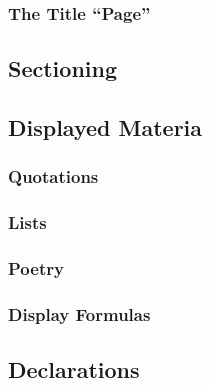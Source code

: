 \subsubsection{The Title ``Page''}


\subsection{Sectioning}


\subsection{Displayed Materia}
\subsubsection{Quotations}
\subsubsection{Lists}
\subsubsection{Poetry}
\subsubsection{Display Formulas}


\subsection{Declarations}
